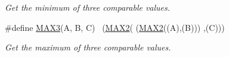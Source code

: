 \begin{DoxyCompactItemize}
\begin{DoxyCompactList}\small\item\em Get the minimum of three comparable values. \end{DoxyCompactList}\item 
\#define \hyperlink{group__utils_ga27c2f8e6ef48853a348897da2ef8e7f8}{M\+A\+X3}(A,  B,  C)  ~(\hyperlink{group__utils_gadd91367918fadbc8d585940d6206d6d2}{M\+A\+X2}(  (\hyperlink{group__utils_gadd91367918fadbc8d585940d6206d6d2}{M\+A\+X2}((A),(B))) ,(C)))\hypertarget{group__utils_ga27c2f8e6ef48853a348897da2ef8e7f8}{}\label{group__utils_ga27c2f8e6ef48853a348897da2ef8e7f8}

\begin{DoxyCompactList}\small\item\em Get the maximum of three comparable values. \end{DoxyCompactList}\end{DoxyCompactItemize}

